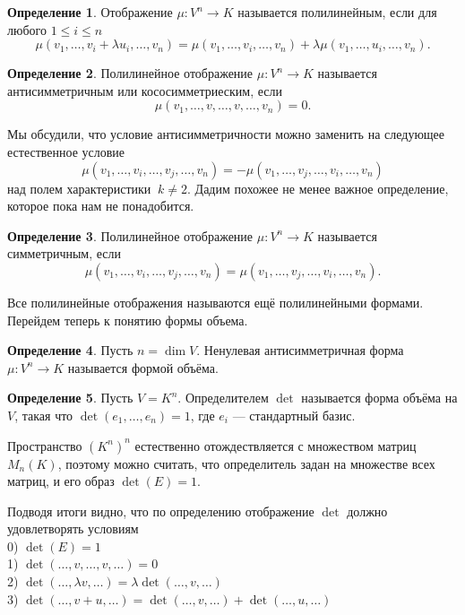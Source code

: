 \documentclass[10pt,a4paper,oneside]{book}
\theoremstyle{definition}
\newtheorem{defn}{Определение}
\begin{document}
\begin{defn}
Отображение $\mu \colon  V^n\to K $ называется полилинейным, если для любого $1\leq i\leq n$ 
$$\mu(v_1,\dots,v_i+\lambda u_i,\dots, v_n)= \mu(v_1,\dots,v_i,\dots, v_n)+\lambda\mu(v_1,\dots,u_i,\dots, v_n).$$
\end{defn}

\begin{defn}
Полилинейное отображение $\mu \colon V^n\to K $ называется антисимметричным или кососимметриеским, если 
$$\mu(v_1,\dots,v,\dots,v,\dots, v_n)=0.$$
\end{defn}

Мы обсудили, что условие антисимметричности можно заменить на следующее естественное условие 
$$\mu(v_1,\dots,v_i,\dots,v_j,\dots, v_n)=-\mu(v_1,\dots,v_j,\dots,v_i,\dots, v_n)$$
над полем характеристики $\ k\neq 2$. Дадим похожее не менее важное определение, которое пока нам не понадобится.

\begin{defn}
Полилинейное отображение $\mu \colon  V^n \to K $ называется симметричным, если 
$$\mu(v_1,\dots,v_i,\dots,v_j,\dots, v_n)= \mu(v_1,\dots,v_j,\dots,v_i,\dots, v_n).$$
\end{defn}

Все полилинейные отображения называются ещё полилинейными формами. Перейдем теперь к понятию формы объема.

\begin{defn}
Пусть $n=\dim V$. Ненулевая антисимметричная форма $\mu \colon V^n \to K $ называется формой объёма.
\end{defn}


\begin{defn}
Пусть $V=K^n$. Определителем $\det$ называется форма объёма на $V$, такая что $\det(e_1,\dots, e_n)=1$, где $e_i$ --- стандартный базис.
\end{defn}

Пространство $(K^n)^n$ естественно отождествляется с множеством матриц $M_n(K)$, поэтому можно считать, что определитель задан на множестве всех матриц, и его образ $\det(E)=1$.

Подводя итоги видно, что по определению отображение $\det$ должно удовлетворять условиям \\
0) $\det(E)=1$\\
1) $\det(\dots,v,\dots,v,\dots)=0$\\
2) $\det(\dots,\lambda v,\dots)=\lambda\det(\dots,v,\dots)$\\
3) $\det(\dots,v+u,\dots)=\det(\dots,v,\dots)+\det(\dots,u,\dots)$\\
\end{document}
